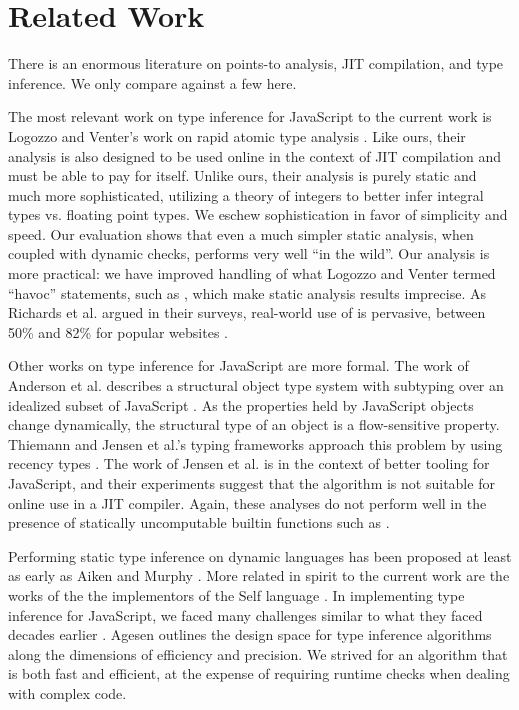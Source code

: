 \section{Related Work}
\label{sec:related-work}

There is an enormous literature on points-to analysis, JIT compilation, and
type inference. We only compare against a few here.

The most relevant work on type inference for JavaScript to the current work is
Logozzo and Venter's work on rapid atomic type analysis \cite{Logozzo10}.
Like ours, their analysis is also designed to be used online in the context of
JIT compilation and must be able to pay for itself. Unlike ours, their
analysis is purely static and much more sophisticated, utilizing a theory of
integers to better infer integral types vs. floating point types. We eschew
sophistication in favor of simplicity and speed. Our evaluation shows that
even a much simpler static analysis, when coupled with dynamic checks, performs
very well ``in the wild''.
Our analysis is more
practical: we have improved handling of what Logozzo and Venter termed ``havoc''
statements, such as , which make static analysis results
imprecise. As Richards et al. argued in their surveys, real-world use of
 is pervasive, between 50\% and 82\% for popular websites
\cite{Richards11, Richards10}.

Other works on type inference for JavaScript are more formal. The work of
Anderson et al. describes a structural object type system with subtyping over
an idealized subset of JavaScript \cite{Anderson05}. As the properties held
by JavaScript objects change dynamically,
the structural type of an object is a flow-sensitive property. Thiemann
and Jensen et al.'s typing frameworks approach this problem by using recency
types \cite{Thiemann05, Jensen09}. The work of Jensen et al. is in the context
of better tooling for JavaScript, and their experiments suggest that the
algorithm is not suitable for online use in a JIT compiler. Again, these
analyses do not perform well in the presence of statically uncomputable
builtin functions such as .

Performing static type inference on dynamic languages has been proposed at
least as early as Aiken and Murphy \cite{Aiken91}. More related in spirit to
the current work are the works of the the implementors of the Self language
\cite{Ungar87}. In implementing type inference for JavaScript, we faced many
challenges similar to what they faced decades earlier \cite{Ungar92,
  Agesen94}. Agesen outlines the design space for type inference algorithms
along the dimensions of efficiency and precision. We strived for an
algorithm that is both fast and efficient, at the expense of requiring
runtime checks when dealing with complex code.


